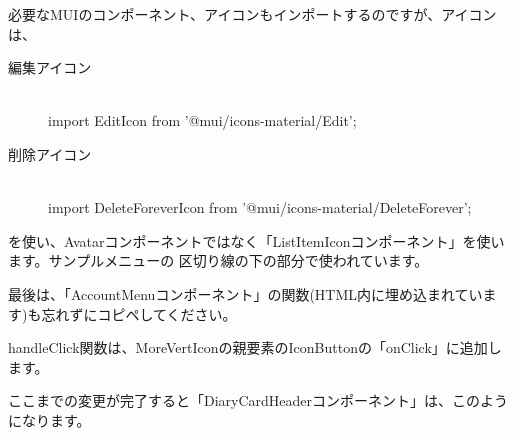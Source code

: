 \vspace*{\baselineskip}

必要なMUIのコンポーネント、アイコンもインポートするのですが、アイコンは、

\begin{description}
\item[編集アイコン] \mbox{} \\
import EditIcon from '@mui/icons{-}material/Edit';
\item[削除アイコン] \mbox{} \\
import DeleteForeverIcon from '@mui/icons{-}material/DeleteForever';
\end{description}

を使い、Avatarコンポーネントではなく「ListItemIconコンポーネント」を使います。サンプルメニューの
区切り線の下の部分で使われています。

\vspace*{\baselineskip}

最後は、「AccountMenuコンポーネント」の関数(HTML内に埋め込まれています)も忘れずにコピペしてください。

\vspace*{\baselineskip}

handleClick関数は、MoreVertIconの親要素のIconButtonの「onClick」に追加します。

ここまでの変更が完了すると「DiaryCardHeaderコンポーネント」は、このようになります。

